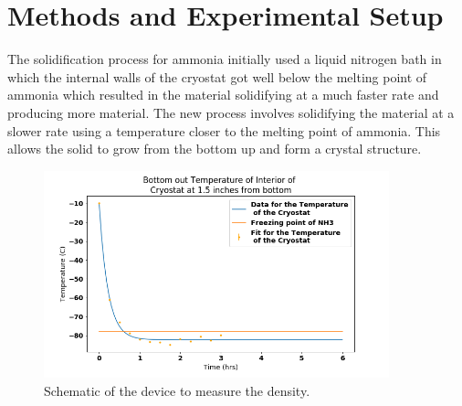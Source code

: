 \documentclass[12pt,notitlepage]{amsart}
\begin{document}
 
  \section{Methods and Experimental Setup}The solidification process for ammonia initially used a liquid nitrogen bath in which the internal walls of the cryostat got well below the melting point of ammonia which resulted in the material solidifying at a much faster rate and producing more material. The new process involves solidifying the material at a slower rate using a temperature closer to the melting point of ammonia. This allows the solid to grow from the bottom up and form a crystal structure. 
    \begin{figure}[h]
 \caption{Schematic of the device to measure the density.}
 \label{Tvt}
 \centering
  \includegraphics[width = 10cm,height = 6cm]{Temperature_Time_2}
\end{figure}
\end{document}
